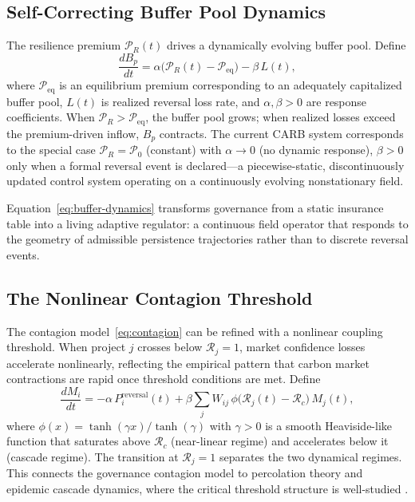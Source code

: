 \documentclass[12pt]{article}
\begin{document}
\subsection{Self-Correcting Buffer Pool Dynamics}

The resilience premium $\mathcal{P}_R(t)$ drives a dynamically evolving buffer pool. Define
\begin{equation}
\label{eq:buffer-dynamics}
\frac{dB_p}{dt}
= \alpha\bigl(\mathcal{P}_R(t) - \mathcal{P}_\text{eq}\bigr)
- \beta\,L(t),
\end{equation}
where $\mathcal{P}_\text{eq}$ is an equilibrium premium corresponding to an adequately
capitalized buffer pool, $L(t)$ is realized reversal loss rate, and $\alpha,\beta>0$ are
response coefficients. When $\mathcal{P}_R > \mathcal{P}_\text{eq}$, the buffer pool grows;
when realized losses exceed the premium-driven inflow, $B_p$ contracts. The current CARB
system corresponds to the special case $\mathcal{P}_R = \mathcal{P}_0$ (constant) with
$\alpha \to 0$ (no dynamic response), $\beta>0$ only when a formal reversal event is
declared---a piecewise-static, discontinuously updated control system operating on a
continuously evolving nonstationary field.

Equation~\eqref{eq:buffer-dynamics} transforms governance from a static insurance table
into a living adaptive regulator: a continuous field operator that responds to the geometry
of admissible persistence trajectories rather than to discrete reversal events.

\subsection{The Nonlinear Contagion Threshold}

The contagion model~\eqref{eq:contagion} can be refined with a nonlinear coupling threshold.
When project $j$ crosses below $\mathcal{R}_j=1$, market confidence losses accelerate
nonlinearly, reflecting the empirical pattern that carbon market contractions are rapid
once threshold conditions are met. Define
\begin{equation}
\label{eq:contagion-nonlinear}
\frac{dM_i}{dt}
= -\alpha\,P_i^\text{reversal}(t)
+ \beta\sum_j W_{ij}\,\phi\bigl(\mathcal{R}_j(t) - \mathcal{R}_c\bigr)\,M_j(t),
\end{equation}
where $\phi(x) = \tanh(\gamma x)/\tanh(\gamma)$ with $\gamma>0$ is a smooth Heaviside-like
function that saturates above $\mathcal{R}_c$ (near-linear regime) and accelerates below
it (cascade regime). The transition at $\mathcal{R}_j=1$ separates the two dynamical regimes.
This connects the governance contagion model to percolation theory and epidemic cascade
dynamics, where the critical threshold structure is well-studied \citep{Holland1992}.
\end{document}
